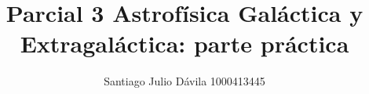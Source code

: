 \documentclass[final,5p,times,twocolumn, nopreprintline]{elsarticle}
\numberwithin{equation}{section}
\begin{document}
\begin{frontmatter}



\title{Parcial 3 Astrofísica Galáctica y Extragaláctica: parte práctica}


\author[first]{Santiago Julio Dávila 1000413445}


%



%
%


\end{frontmatter}
\end{document}
